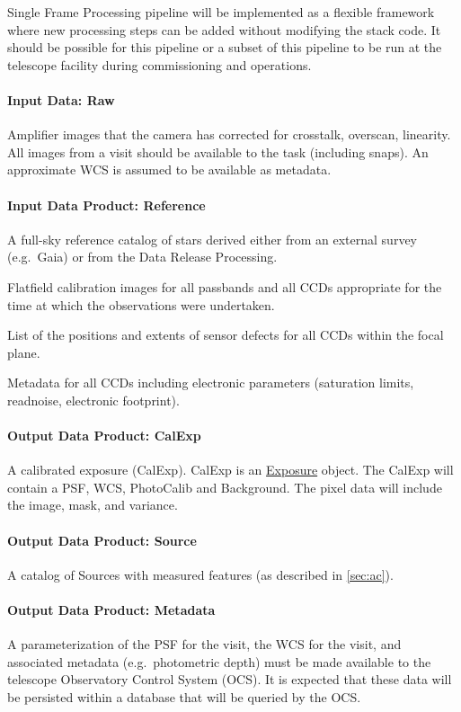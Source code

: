 Single Frame Processing pipeline will be implemented as a flexible   framework where new processing steps can be added without modifying the stack code. It should be possible for this pipeline or a subset of this pipeline  to be run at the telescope facility during commissioning and operations.  

\paragraph{Input Data: Raw}

Amplifier images that the camera has corrected for crosstalk, overscan, linearity.  All images from a visit should be available to the task (including snaps). An approximate WCS is assumed to be available as metadata.

\paragraph{Input Data Product: Reference}

A full-sky reference catalog of stars derived either from an external survey (e.g.\ Gaia) or from the Data Release Processing.

Flatfield calibration images for all passbands and all CCDs appropriate for the time at which the observations were undertaken.

List of the positions and extents of sensor defects for all CCDs within the focal plane.

Metadata for all CCDs including electronic parameters (saturation limits, readnoise, electronic footprint).

\paragraph{Output Data Product: CalExp}

A calibrated exposure (CalExp).  CalExp is an \hyperref[sec:spImagesExposure]{Exposure} object. The CalExp will contain a PSF, WCS, PhotoCalib and Background. The pixel data will include the image, mask, and variance. 

\paragraph{Output Data Product: Source}

A catalog of Sources with measured features (as described in \ref{sec:ac}). 


\paragraph{Output Data Product: Metadata}
A parameterization of the PSF for the visit, the WCS for the visit,
and associated metadata (e.g.\ photometric depth) must be made
available to the telescope Observatory Control System (OCS). It is
expected that these data will be persisted within a database that will
be queried by the OCS.


